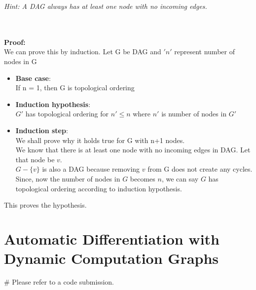 \documentclass[a4paper,10pt]{article}
\begin{document}
\begin{enumerate}
\begin{taskbox}
    \emph{Hint: A DAG always has at least one node with no incoming edges.}
    \end{taskbox}
    \\ \\ \textbf{Proof:} \\
    We can prove this by induction. Let G be DAG and $'n'$ represent number of nodes in G\\
    \begin{itemize}
        \item \textbf{Base case}:
        \\ If n = 1, then G is topological ordering
        \item \textbf{Induction hypothesis}:
        \\ $G'$ has topological ordering for $n' \leq n$ where $n'$ is number of nodes in $G'$
        \item \textbf{Induction step}:
        \\ We shall prove why it holds true for G with n+1 nodes.
        \\ We know that there is at least one node with no incoming edges in DAG. Let that node be $v$.
        \\ $G - \{v\}$ is also a DAG because removing $v$ from G does not create any cycles.
        \\ Since, now the number of nodes in $G$ becomes $n$, we can say $G$ has topological ordering according to induction hypothesis.
    \end{itemize}
    This proves the hypothesis.
\end{enumerate}

\section{Automatic Differentiation with Dynamic Computation Graphs}
\begin{enumerate}
   # Please refer to a code submission.
\end{enumerate}
\end{document}
